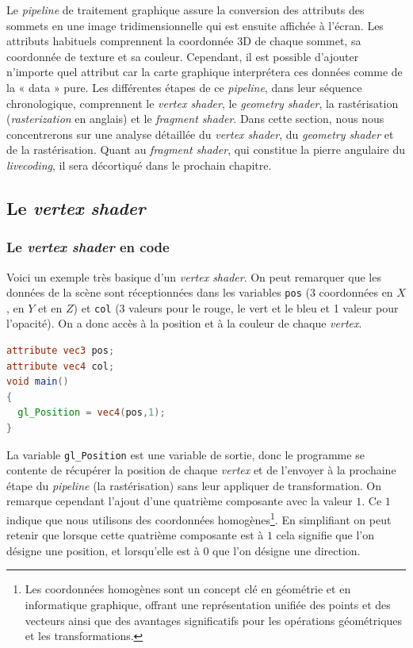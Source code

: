 Le \textit{pipeline} de traitement graphique assure la conversion des attributs des sommets en une image tridimensionnelle qui est ensuite affichée à l'écran. Les attributs habituels comprennent la coordonnée 3D de chaque sommet, sa coordonnée de texture et sa couleur. Cependant, il est possible d'ajouter n'importe quel attribut car la carte graphique interprétera ces données comme de la « data » pure. Les différentes étapes de ce \textit{pipeline}, dans leur séquence chronologique, comprennent le \textit{vertex shader}, le \textit{geometry shader}, la rastérisation (\textit{rasterization} en anglais) et le \textit{fragment shader}. Dans cette section, nous nous concentrerons sur une analyse détaillée du \textit{vertex shader}, du \textit{geometry shader} et de la rastérisation. Quant au \textit{fragment shader}, qui constitue la pierre angulaire du \textit{livecoding}, il sera décortiqué dans le prochain chapitre.


\subsection*{Le \textit{vertex shader}}

\subsubsection*{Le \textit{vertex shader} en code}
Voici un exemple très basique d'un \textit{vertex shader}. On peut remarquer que les données de la scène sont réceptionnées dans les variables \lstinline{pos} (3 coordonnées en $X$, en $Y$ et en $Z$) et \lstinline{col} (3 valeurs pour le rouge, le vert et le bleu et 1 valeur pour l'opacité). On a donc accès à la position et à la couleur de chaque \textit{vertex}.

\begin{minipage}{\linewidth}
\begin{lstlisting}[language=GLSL, caption=\textit{Vertex shader} en GLSL]
attribute vec3 pos;
attribute vec4 col;
void main()
{
  gl_Position = vec4(pos,1);
}
\end{lstlisting}
\end{minipage}

La variable \lstinline{gl_Position} est une variable de sortie, donc le programme se contente de récupérer la position de chaque \textit{vertex} et de l'envoyer à la prochaine étape du \textit{pipeline} (la rastérisation) sans leur appliquer de transformation. On remarque cependant l'ajout d'une quatrième composante avec la valeur $1$. Ce $1$ indique que nous utilisons des coordonnées homogènes\footnote{Les coordonnées homogènes sont un concept clé en géométrie et en informatique graphique, offrant une représentation unifiée des points et des vecteurs ainsi que des avantages significatifs pour les opérations géométriques et les transformations.}. En simplifiant on peut retenir que lorsque cette quatrième composante est à $1$ cela signifie que l'on désigne une position, et lorsqu'elle est à $0$ que l'on désigne une direction.

